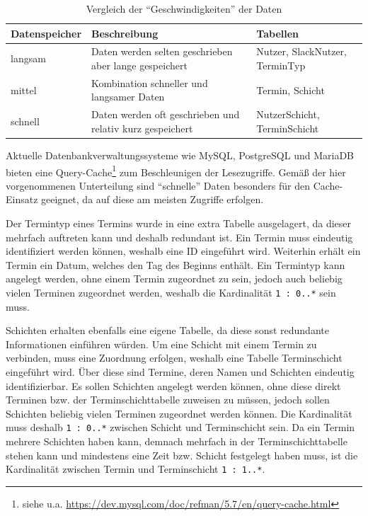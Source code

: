 \begin{table}[H]
    \begin{tabularx}{0.9\columnwidth}{|l|X|X|}
    \hline
    \textbf{Datenspeicher} & \textbf{Beschreibung} & \textbf{Tabellen} \\
    \hline
    langsam & Daten werden selten geschrieben aber lange gespeichert & Nutzer, SlackNutzer, TerminTyp \\
    \hline
    mittel & Kombination schneller und langsamer Daten & Termin, Schicht \\
    \hline
    schnell & Daten werden oft geschrieben und relativ kurz gespeichert & NutzerSchicht, TerminSchicht \\
    \hline
    \end{tabularx}
    \caption{Vergleich der \enquote{Geschwindigkeiten} der Daten}
    \label{tab:db-speed}
\end{table}

Aktuelle Datenbankverwaltungssysteme wie MySQL, PostgreSQL und MariaDB bieten eine Query-Cache\footnote{siehe u.a. \url{https://dev.mysql.com/doc/refman/5.7/en/query-cache.html}} zum Beschleunigen der Lesezugriffe. Gemäß der hier vorgenommenen Unterteilung sind \enquote{schnelle} Daten besonders für den Cache-Einsatz geeignet, da auf diese am meisten Zugriffe erfolgen. 

Der Termintyp eines Termins wurde in eine extra Tabelle ausgelagert, da dieser mehrfach auftreten kann und deshalb redundant ist. Ein Termin muss eindeutig identifiziert werden können, weshalb eine ID eingeführt wird. Weiterhin erhält ein Termin ein Datum, welches den Tag des Beginns enthält. Ein Termintyp kann angelegt werden, ohne einem Termin zugeordnet zu sein, jedoch auch beliebig vielen Terminen zugeordnet werden, weshalb die Kardinalität \texttt{1 : 0..*} sein muss.

Schichten erhalten ebenfalls eine eigene Tabelle, da diese sonst redundante Informationen einführen würden. Um eine Schicht mit einem Termin zu verbinden, muss eine Zuordnung erfolgen, weshalb eine Tabelle Terminschicht eingeführt wird. Über diese sind Termine, deren Namen und Schichten eindeutig identifizierbar. Es sollen Schichten angelegt werden können, ohne diese direkt Terminen bzw. der Terminschichttabelle zuweisen zu müssen, jedoch sollen Schichten beliebig vielen Terminen zugeordnet werden können. Die Kardinalität muss deshalb \texttt{1 : 0..*} zwischen Schicht und Terminschicht sein. Da ein Termin mehrere Schichten haben kann, demnach mehrfach in der Terminschichttabelle stehen kann und mindestens eine Zeit bzw. Schicht festgelegt haben muss, ist die Kardinalität zwischen Termin und Terminschicht \texttt{1 : 1..*}.

